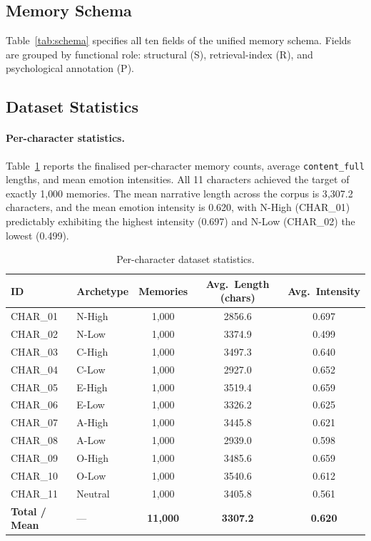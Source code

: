 \subsection{Memory Schema}
\label{app:schema}

Table~\ref{tab:schema} specifies all ten fields of the unified memory schema. Fields are grouped by functional role: structural (S), retrieval-index (R), and psychological annotation (P).


\subsection{Dataset Statistics}
\label{app:stats}

\paragraph{Per-character statistics.}
Table~\ref{tab:dataset_stats} reports the finalised per-character memory counts, average \texttt{content\_full} lengths, and mean emotion intensities. All 11 characters achieved the target of exactly 1{,}000 memories. The mean narrative length across the corpus is 3{,}307.2 characters, and the mean emotion intensity is 0.620, with N-High (CHAR\_01) predictably exhibiting the highest intensity (0.697) and N-Low (CHAR\_02) the lowest (0.499).

\begin{table}[h]
\centering
\caption{Per-character dataset statistics.}
\label{tab:dataset_stats}
\small
\begin{tabular}{llccc}
\toprule
\textbf{ID} & \textbf{Archetype} & \textbf{Memories} & \textbf{Avg.\ Length (chars)} & \textbf{Avg.\ Intensity} \\
\midrule
CHAR\_01 & N-High   & 1,000 & 2856.6 & 0.697 \\
CHAR\_02 & N-Low    & 1,000 & 3374.9 & 0.499 \\
CHAR\_03 & C-High   & 1,000 & 3497.3 & 0.640 \\
CHAR\_04 & C-Low    & 1,000 & 2927.0 & 0.652 \\
CHAR\_05 & E-High   & 1,000 & 3519.4 & 0.659 \\
CHAR\_06 & E-Low    & 1,000 & 3326.2 & 0.625 \\
CHAR\_07 & A-High   & 1,000 & 3445.8 & 0.621 \\
CHAR\_08 & A-Low    & 1,000 & 2939.0 & 0.598 \\
CHAR\_09 & O-High   & 1,000 & 3485.6 & 0.659 \\
CHAR\_10 & O-Low    & 1,000 & 3540.6 & 0.612 \\
CHAR\_11 & Neutral  & 1,000 & 3405.8 & 0.561 \\
\midrule
\textbf{Total / Mean} & --- & \textbf{11,000} & \textbf{3307.2} & \textbf{0.620} \\
\bottomrule
\end{tabular}
\end{table}

